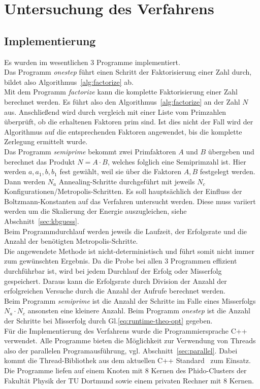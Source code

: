 \chapter{Untersuchung des Verfahrens}\label{ch:results}

\section{Implementierung}
Es wurden im wesentlichen $3$ Programme implementiert.  \\
Das Programm \textit{onestep} führt einen Schritt der Faktorisierung einer Zahl durch, bildet also Algorithmus~\ref{alg:factorize} ab. \\
Mit dem Programm \textit{factorize} kann die komplette Faktorisierung einer Zahl berechnet werden. Es führt also den Algorithmus~\ref{alg:factorize} an der Zahl $N$ aus. Anschließend wird durch vergleich mit einer Liste vom Primzahlen überprüft, ob die erhaltenen Faktoren prim sind. Ist dies nicht der Fall wird der Algorithmus auf die entsprechenden Faktoren angewendet, bis die komplette Zerlegung ermittelt wurde. \\
Das Programm \textit{semiprime} bekommt zwei Primfaktoren $A$ und $B$ übergeben und berechnet das Produkt $N=A\cdot B$, welches folglich eine Semiprimzahl ist. Hier werden $a, a_1, b, b_1$ fest gewählt, weil sie über die Faktoren $A,B$ festgelegt werden. Dann werden $N_a$ Annealing-Schritte durchgeführt mit jeweils $N_c$ Konfigurationen/Metropolis-Schritten. Es soll hauptsächlich der Einfluss der Boltzmann-Konstanten auf das Verfahren untersucht werden. Diese muss variiert werden um die Skalierung der Energie auszugleichen, siehe Abschnitt~\ref{sec:kbguess}. \\
Beim Programmdurchlauf werden jeweils die Laufzeit, der Erfolgsrate und die Anzahl der benötigten Metropolis-Schritte. \\
Die angewendete Methode ist nicht-deterministisch und führt somit nicht immer zum gewünschten Ergebnis. Da die Probe bei allen $3$ Programmen effizient durchführbar ist, wird bei jedem Durchlauf der Erfolg oder Misserfolg gespeichert. Daraus kann die Erfolgsrate durch Division der Anzahl der erfolgreichen Versuche durch die Anzahl der Aufrufe berechnet werden. \\
Beim Programm \textit{semiprime} ist die Anzahl der Schritte im Falle eines Misserfolgs $N_a\cdot N_c$ ansonsten eine kleinere Anzahl. Beim Programm \textit{onestep} ist die Anzahl der Schritte bei Misserfolg durch Gl.\eqref{eq:runtime-theo-opt} gegeben.\\
Für die Implementierung des Verfahrens wurde die Programmiersprache C++ verwendet. Alle Programme bieten die Möglichkeit zur Verwendung von Threads also der parallelen Programausführung, vgl. Abschnitt~\ref{sec:parallel}. Dabei kommt die Thread-Bibliothek aus dem aktuellen C++ Standard~\parencite{cppthreads} zum Einsatz. \\
Die Programme liefen auf einem Knoten mit $8$ Kernen des Phido-Clusters der Fakultät Physik der TU Dortmund sowie einem privaten Rechner mit $8$ Kernen.

